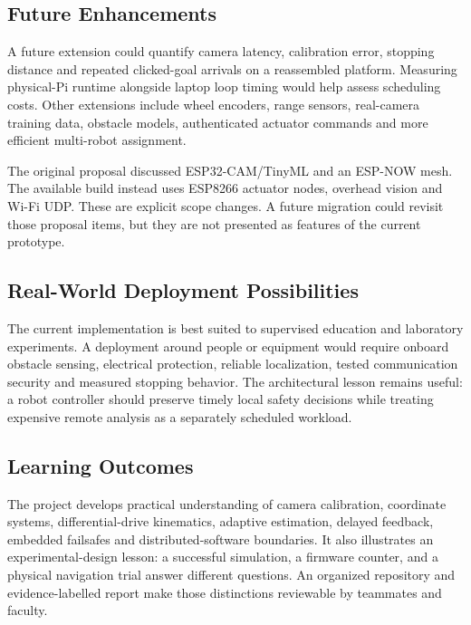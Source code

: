 \documentclass[11pt,a4paper]{article}
\begin{document}
\subsection{Future Enhancements}
A future extension could quantify camera latency, calibration error, stopping
distance and repeated clicked-goal arrivals on a reassembled platform. Measuring
physical-Pi runtime alongside laptop loop timing would help assess scheduling
costs. Other extensions include wheel encoders, range sensors, real-camera
training data, obstacle models, authenticated actuator commands and more
efficient multi-robot assignment.

The original proposal discussed ESP32-CAM/TinyML and an ESP-NOW mesh. The available
build instead uses ESP8266 actuator nodes, overhead vision and Wi-Fi UDP. These
are explicit scope changes. A future migration could revisit those proposal items,
but they are not presented as features of the current prototype.

\subsection{Real-World Deployment Possibilities}
The current implementation is best suited to supervised education and laboratory
experiments. A deployment around people or equipment would require onboard obstacle
sensing, electrical protection, reliable localization, tested communication security
and measured stopping behavior. The architectural lesson remains useful: a robot
controller should preserve timely local safety decisions while treating expensive
remote analysis as a separately scheduled workload.

\subsection{Learning Outcomes}
The project develops practical understanding of camera calibration, coordinate
systems, differential-drive kinematics, adaptive estimation, delayed feedback,
embedded failsafes and distributed-software boundaries. It also illustrates an
experimental-design lesson: a successful simulation, a firmware counter, and a
physical navigation trial answer different questions. An organized repository and
evidence-labelled report make those distinctions reviewable by teammates and faculty.
\end{document}
